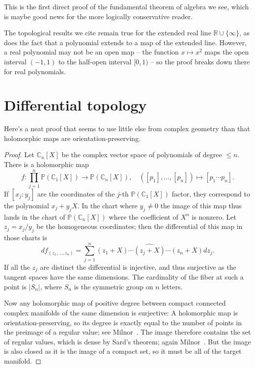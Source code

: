 \documentclass[11pt,draft]{article}
\newcommand{\kk}[1]{\mathbb{#1}}
\begin{document}
This is the first direct proof of the fundamental theorem of algebra we see,
which is maybe good news for the more logically conservative reader.

The topological results we cite remain true for the extended real line $\kk R \cup \{\infty\}$,
as does the fact that a polynomial extends to a map of the extended line.
However, a real polynomial may not be an open map -- the function $x \mapsto x^2$
maps the open interval $(-1,1)$ to the half-open interval $[0,1)$ -- so the
proof breaks down there for real polynomials.



\section{Differential topology}


Here's a neat proof that seems to use little else from complex geometry than
that holomorphic maps are orientation-preserving.

\begin{proof}
Let $\kk C_n[X]$ be the complex vector space of polynomials of degree $\leq n$.
There is a holomorphic map
\[
    f : \prod_{j=1}^n \kk P(\kk C_1[X])
    \to \kk P(\kk C_n[X]),
    \quad
    ([p_1], \ldots, [p_n]) \mapsto [p_1 \cdots p_n].
\]
If $[x_j:y_j]$ are the coordinates of the $j$-th $\kk P(\kk C_1[X])$ factor,
they correspond to the polynomial $x_j + y_j X$. In the chart where $y_j \not=
0$ the image of this map thus lands in the chart of $\kk P(\kk C_n[X])$ where
the coefficient of $X^n$ is nonzero.
Let $z_j = x_j / y_j$ be the homogeneous coordinates; then
the differential of this map in those charts is
\[
    df_{(z_1, \ldots, z_n)}
    = \sum_{j=1}^n (z_1 + X) \cdots \widehat{(z_j+X)} \cdots (z_n+X) d z_j.
\]
If all the $z_j$ are distinct the differential is injective, and thus
surjective as the tangent spaces have the same dimensions. The cardinality of
the fiber at such a point is $|S_n|$,
where $S_n$ is the symmetric group on $n$ letters.

Now any holomorphic map of positive degree between compact connected complex
manifolds of the same dimension is surjective: A holomorphic map is
orientation-preserving, so its degree is exactly equal to the number of points
in the preimage of a regular value; see Milnor~\cite[Section~5]{milnor}.
The image therefore contains the set of
regular values, which is dense by Sard's theorem; again Milnor~\cite[Section~2]{milnor}.
But the image is also closed as it is the image of a compact set, so it must be
all of the target manifold.
\end{proof}
\end{document}
